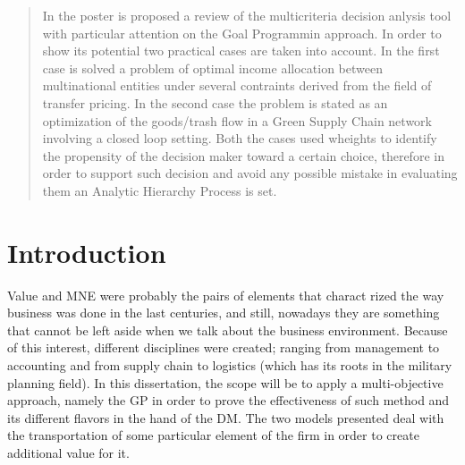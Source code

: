 \documentclass[a0,portrait]{a0poster}
\begin{document}
\begin{multicols}{2} %


\color{Navy} %

\begin{abstract}
	In the poster is proposed a review of the multicriteria decision anlysis tool with particular attention on the Goal Programmin approach. In order to show its potential two practical cases are taken into account. In the first case is solved a problem of optimal income allocation between multinational entities under several contraints derived from the field of transfer pricing. In the second case the problem is stated as an optimization of the goods/trash flow in a Green Supply Chain network involving a closed loop setting. Both the cases used wheights to identify the propensity of the decision maker toward a certain choice, therefore in order to support such decision and avoid any possible mistake in evaluating them an Analytic Hierarchy Process is set.

\end{abstract}


\color{SaddleBrown} %

\section*{Introduction}

Value and MNE were probably the pairs of elements that charact rized the way business was done in the last centuries, and still, nowadays they are something that cannot be left aside when we talk about the business environment. Because of this interest, different disciplines were created; ranging from management to accounting and from supply chain to logistics (which has its roots in the military planning field). In this dissertation, the scope will be to apply a multi-objective approach, namely the GP in order to prove the effectiveness of such method and its different flavors in the hand of the DM. The two models presented deal with the transportation of some particular element of the firm in order to create additional value for it. 


\end{multicols}
\end{document}
